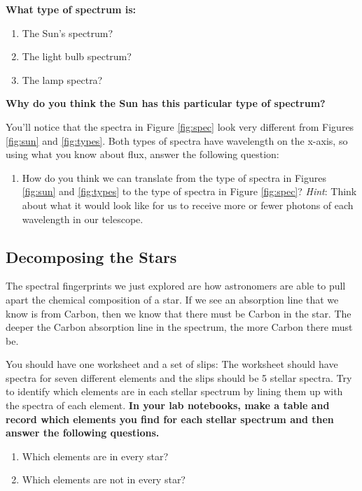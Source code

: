 \documentclass[11pt]{article}
\begin{document}
\noindent
\textbf{What type of spectrum is:}
\begin{enumerate}
    \item The Sun's spectrum?
    \item The light bulb spectrum?
    \item The lamp spectra?
\end{enumerate}
\noindent
\textbf{Why do you think the Sun has this particular type of spectrum?}

\medskip \noindent
You'll notice that the spectra in Figure \ref{fig:spec} look very different from Figures \ref{fig:sun} and \ref{fig:types}.  Both types of spectra have wavelength on the x-axis, so using what you know about flux, answer the following question:
\begin{enumerate}
    \item How do you think we can translate from the type of spectra in Figures \ref{fig:sun} and \ref{fig:types} to the type of spectra in Figure \ref{fig:spec}? \textit{Hint}: Think about what it would look like for us to receive more or fewer photons of each wavelength in our telescope.
\end{enumerate}

\subsection{Decomposing the Stars}
The spectral fingerprints we just explored are how astronomers are able to pull apart the chemical composition of a star.  If we see an absorption line that we know is from Carbon, then we know that there must be Carbon in the star. The deeper the Carbon absorption line in the spectrum, the more Carbon there must be.

\medskip \noindent
You should have one worksheet and a set of slips: The worksheet should have spectra for seven different elements and the slips should be 5 stellar spectra. Try to identify which elements are in each stellar spectrum by lining them up with the spectra of each element. \textbf{In your lab notebooks, make a table and record which elements you find for each stellar spectrum and then answer the following questions.}
\begin{enumerate}
    \item Which elements are in every star?
    \item Which elements are not in every star?
\end{enumerate}
\end{document}
